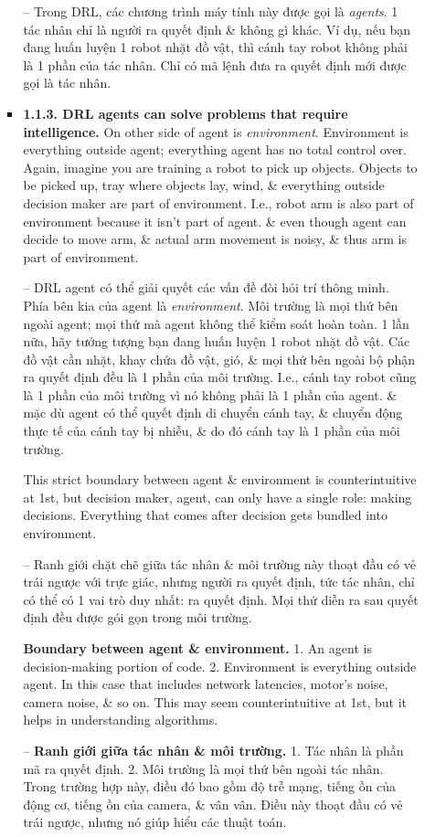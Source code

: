 \documentclass{article}
\begin{document}
\begin{itemize}
\begin{itemize}
\begin{itemize}
            -- Trong DRL, các chương trình máy tính này được gọi là {\it agents}. 1 tác nhân chỉ là người ra quyết định \& không gì khác. Ví dụ, nếu bạn đang huấn luyện 1 robot nhặt đồ vật, thì cánh tay robot không phải là 1 phần của tác nhân. Chỉ có mã lệnh đưa ra quyết định mới được gọi là tác nhân.
            \item {\bf1.1.3. DRL agents can solve problems that require intelligence.} On other side of agent is {\it environment}. Environment is everything outside agent; everything agent has no total control over. Again, imagine you are training a robot to pick up objects. Objects to be picked up, tray where objects lay, wind, \& everything outside decision maker are part of environment. I.e., robot arm is also part of environment because it isn't part of agent. \& even though agent can decide to move arm, \& actual arm movement is noisy, \& thus arm is part of environment.

            -- {\sf DRL agent có thể giải quyết các vấn đề đòi hỏi trí thông minh.} Phía bên kia của agent là {\it environment}. Môi trường là mọi thứ bên ngoài agent; mọi thứ mà agent không thể kiểm soát hoàn toàn. 1 lần nữa, hãy tưởng tượng bạn đang huấn luyện 1 robot nhặt đồ vật. Các đồ vật cần nhặt, khay chứa đồ vật, gió, \& mọi thứ bên ngoài bộ phận ra quyết định đều là 1 phần của môi trường. I.e., cánh tay robot cũng là 1 phần của môi trường vì nó không phải là 1 phần của agent. \& mặc dù agent có thể quyết định di chuyển cánh tay, \& chuyển động thực tế của cánh tay bị nhiễu, \& do đó cánh tay là 1 phần của môi trường.

            This strict boundary between agent \& environment is counterintuitive at 1st, but decision maker, agent, can only have a single role: making decisions. Everything that comes after decision gets bundled into environment.

            -- Ranh giới chặt chẽ giữa tác nhân \& môi trường này thoạt đầu có vẻ trái ngược với trực giác, nhưng người ra quyết định, tức tác nhân, chỉ có thể có 1 vai trò duy nhất: ra quyết định. Mọi thứ diễn ra sau quyết định đều được gói gọn trong môi trường.

            {\bf Boundary between agent \& environment.} 1. An agent is decision-making portion of code. 2. Environment is everything outside agent. In this case that includes network latencies, motor's noise, camera noise, \& so on. This may seem counterintuitive at 1st, but it helps in understanding algorithms.

            -- {\bf Ranh giới giữa tác nhân \& môi trường.} 1. Tác nhân là phần mã ra quyết định. 2. Môi trường là mọi thứ bên ngoài tác nhân. Trong trường hợp này, điều đó bao gồm độ trễ mạng, tiếng ồn của động cơ, tiếng ồn của camera, \& vân vân. Điều này thoạt đầu có vẻ trái ngược, nhưng nó giúp hiểu các thuật toán.


\end{itemize}
\end{itemize}
\end{itemize}
\end{document}

